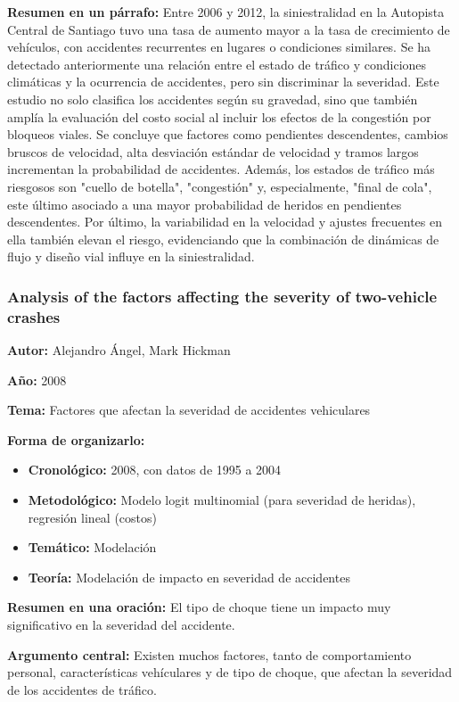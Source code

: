 \documentclass{book}
\begin{document}
\textbf{Resumen en un párrafo:} Entre 2006 y 2012, la siniestralidad en la Autopista Central de Santiago tuvo una  tasa de aumento mayor a la tasa de crecimiento de vehículos, con accidentes recurrentes en lugares o condiciones similares. Se ha detectado anteriormente una relación entre el estado de tráfico y condiciones climáticas y la ocurrencia de accidentes, pero sin discriminar la severidad. Este estudio no solo clasifica los accidentes según su gravedad, sino que también amplía la evaluación del costo social al incluir los efectos de la congestión por bloqueos viales. Se concluye que factores como pendientes descendentes, cambios bruscos de velocidad, alta desviación estándar de velocidad y tramos largos incrementan la probabilidad de accidentes. Además, los estados de tráfico más riesgosos son "cuello de botella", "congestión" y, especialmente, "final de cola", este último asociado a una mayor probabilidad de heridos en pendientes descendentes. Por último, la variabilidad en la velocidad y ajustes frecuentes en ella también elevan el riesgo, evidenciando que la combinación de dinámicas de flujo y diseño vial influye en la siniestralidad.

\subsubsection{Analysis of the factors affecting the severity of two-vehicle crashes}
\textbf{Autor:} Alejandro Ángel, Mark Hickman

\textbf{Año:} 2008

\textbf{Tema:} Factores que afectan la severidad de accidentes vehiculares

\textbf{Forma de organizarlo:}

\begin{itemize}
\setlength{\itemindent}{0.5in}
    \item \textbf{Cronológico:} 2008, con datos de 1995 a 2004
    \item \textbf{Metodológico:} Modelo logit multinomial (para severidad de heridas), regresión lineal (costos)
    \item \textbf{Temático:} Modelación
    \item \textbf{Teoría:} Modelación de impacto en severidad de accidentes
\end{itemize}

\textbf{Resumen en una oración:} El tipo de choque tiene un impacto muy significativo en la severidad del accidente.

\textbf{Argumento central:} Existen muchos factores, tanto de comportamiento personal, características vehículares y de tipo de choque, que afectan la severidad de los accidentes de tráfico.
\end{document}
